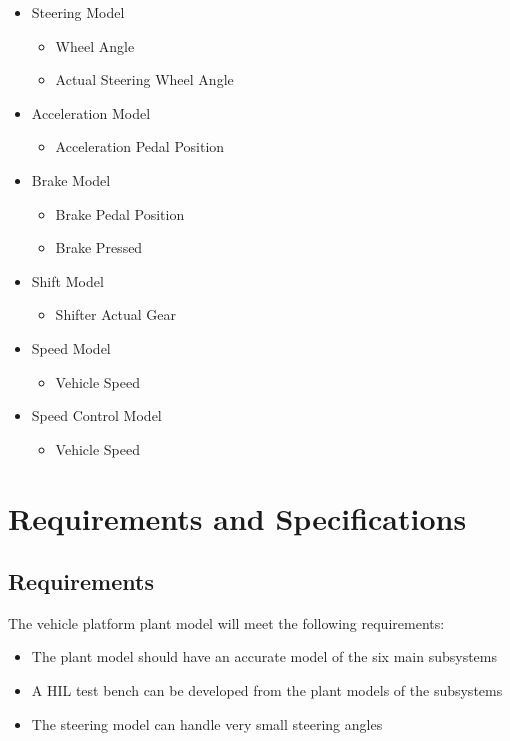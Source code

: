 \documentclass[12pt]{article} %
\begin{document}
\begin{itemize}
    \item Steering Model
    \begin{itemize}
    		\item Wheel Angle
    		\item Actual Steering Wheel Angle
    \end{itemize}
    \item Acceleration Model
    \begin{itemize}
    		\item Acceleration Pedal Position
    \end{itemize}
    \item Brake Model
    \begin{itemize}
    		\item Brake Pedal Position
    		\item Brake Pressed
    \end{itemize}
    \item Shift Model
    \begin{itemize}
    		\item Shifter Actual Gear
    \end{itemize}
    \item Speed Model
    \begin{itemize}
    		\item Vehicle Speed
    \end{itemize}
    \item Speed Control Model
    \begin{itemize}
    		\item Vehicle Speed
    \end{itemize}
\end{itemize}

\section{Requirements and Specifications}
\subsection{Requirements}
The vehicle platform plant model will meet the following requirements:
\begin{itemize}
    \item The plant model should have an accurate model of the six main subsystems
    \item A HIL test bench can be developed from the plant models of the subsystems
    \item The steering model can handle very small steering angles
\end{itemize}
\end{document}

